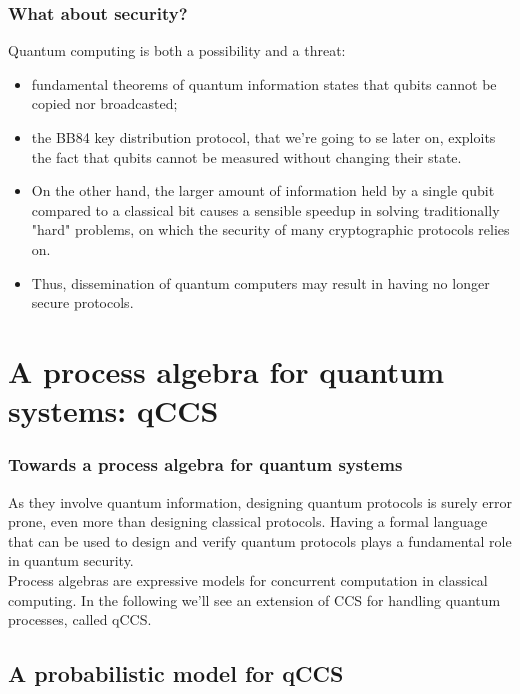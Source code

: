 \documentclass{beamer}
\begin{document}
\begin{frame}
\frametitle{What about security?}
Quantum computing is both a possibility and a threat:
\begin{itemize}
	\item fundamental theorems of quantum information states that qubits cannot be copied
	nor broadcasted;
	\item the BB84 key distribution protocol, that we're going to se later on,
	exploits the fact that qubits cannot be measured without changing their
	state.
	\item On the other hand, the larger amount of information held by a single qubit
	compared to a classical bit causes a sensible speedup in solving traditionally "hard"
	problems, on which the security of many cryptographic protocols relies on.
	\item Thus, dissemination of quantum computers may result in having no longer secure
	 protocols.
\end{itemize}
\end{frame}

\section{A process algebra for quantum systems: qCCS}

\begin{frame}
\frametitle{Towards a process algebra for quantum systems}
As they involve quantum information, designing quantum protocols is surely error prone, even more than designing classical protocols. Having a formal language that can be used to design and verify quantum protocols plays a fundamental role in quantum security. \\
Process algebras are expressive models for concurrent computation in classical computing. In the following we'll see an extension of CCS for handling quantum processes, called qCCS.
\end{frame}

\subsection{A probabilistic model for qCCS}
\end{document}
